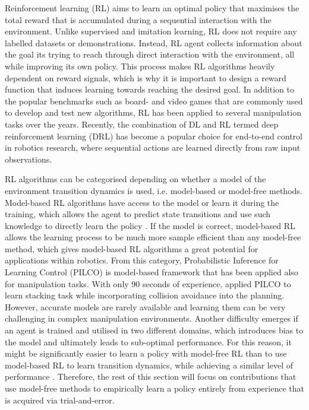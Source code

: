 Reinforcement learning (RL) \cite{sutton_reinforcement_2018} aims to learn an optimal policy that maximises the total reward that is accumulated during a sequential interaction with the environment. Unlike supervised and imitation learning, RL does not require any labelled datasets or demonstrations. Instead, RL agent collects information about the goal its trying to reach through direct interaction with the environment, all while improving its own policy. This process makes RL algorithms heavily dependent on reward signals, which is why it is important to design a reward function that induces learning towards reaching the desired goal. In addition to the popular benchmarks such as board- and video games that are commonly used to develop and test new algorithms, RL has been applied to several manipulation tasks over the years. Recently, the combination of DL and RL termed deep reinforcement learning (DRL) has become a popular choice for end-to-end control in robotics research, where sequential actions are learned directly from raw input observations.

RL algorithms can be categorised depending on whether a model of the environment transition dynamics is used, i.e. model-based or model-free methods. Model-based RL algorithms have access to the model or learn it during the training, which allows the agent to predict state transitions and use such knowledge to directly learn the policy \cite{polydoros_survey_2017}. If the model is correct, model-based RL allows the learning process to be much more sample efficient than any model-free method, which gives model-based RL algorithms a great potential for applications within robotics. From this category, Probabilistic Inference for Learning Control (PILCO) \cite{deisenroth_pilco_2011} is model-based framework that has been applied also for manipulation tasks. With only 90 seconds of experience, \citet{durrant-whyte_learning_2012} applied PILCO to learn stacking task while incorporating collision avoidance into the planning. However, accurate models are rarely available and learning them can be very challenging in complex manipulation environments. Another difficulty emerges if an agent is trained and utilised in two different domains, which introduces bias to the model and ultimately leads to sub-optimal performance. For this reason, it might be significantly easier to learn a policy with model-free RL than to use model-based RL to learn transition dynamics, while achieving a similar level of performance \cite{kroemer_review_2021}. Therefore, the rest of this section will focus on contributions that use model-free methods to empirically learn a policy entirely from experience that is acquired via trial-and-error.

